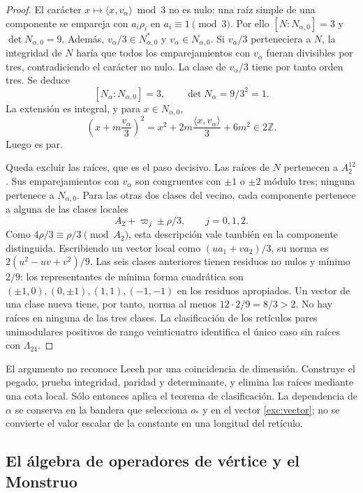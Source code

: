 \begin{proof}
El carácter $x\mapsto\langle x,v_\alpha\rangle\bmod3$ no es nulo:
una raíz simple de una componente se empareja con $a_i\rho_i$ en
$a_i\equiv1\pmod3$. Por ello $[N:N_{\alpha,0}]=3$ y
$\det N_{\alpha,0}=9$. Además,
$v_\alpha/3\in N_{\alpha,0}^*$ y $v_\alpha\in N_{\alpha,0}$.
Si $v_\alpha/3$ perteneciera a $N$, la integridad de $N$ haría que
todos los emparejamientos con $v_\alpha$ fueran divisibles por tres,
contradiciendo el carácter no nulo. La clase de $v_\alpha/3$ tiene
por tanto orden tres. Se deduce
\[
 [N_\alpha:N_{\alpha,0}]=3,
 \qquad \det N_\alpha=9/3^2=1.
\]
La extensión es integral, y para $x\in N_{\alpha,0}$,
\[
 \left(x+m\frac{v_\alpha}{3}\right)^2
   =x^2+2m\frac{\langle x,v_\alpha\rangle}{3}+6m^2
   \in2\mathbb Z.
\]
Luego es par.

Queda excluir las raíces, que es el paso decisivo. Las raíces de $N$
pertenecen a $A_2^{12}$. Sus emparejamientos con $v_\alpha$ son
congruentes con $\pm1$ o $\pm2$ módulo tres; ninguna pertenece a
$N_{\alpha,0}$. Para las otras dos clases del vecino, cada componente
pertenece a alguna de las clases locales
\[
 A_2+\varpi_j\pm\rho/3,\qquad j=0,1,2.
\]
Como $4\rho/3\equiv\rho/3\pmod{A_2}$, esta descripción vale
también en la componente distinguida. Escribiendo un vector local
como $(u a_1+v a_2)/3$, su norma es
$2(u^2-uv+v^2)/9$. Las seis clases anteriores tienen residuos no
nulos y mínimo $2/9$: los representantes de mínima forma cuadrática
son $(\pm1,0),(0,\pm1),(1,1),(-1,-1)$ en los residuos apropiados.
Un vector de una clase nueva tiene, por tanto, norma al menos
$12\cdot2/9=8/3>2$. No hay raíces en ninguna de las tres clases.
La clasificación de los retículos pares unimodulares positivos de
rango veinticuatro identifica el único caso sin raíces con
$\Lambda_{24}$.
\end{proof}

El argumento no reconoce Leech por una coincidencia de dimensión.
Construye el pegado, prueba integridad, paridad y determinante, y
elimina las raíces mediante una cota local. Sólo entonces aplica el
teorema de clasificación. La dependencia de $\alpha$ se conserva en
la bandera que selecciona $o_*$ y en el vector \eqref{exc:vector};
no se convierte el valor escalar de la constante en una longitud del
retículo.

\subsection{El álgebra de operadores de vértice y el Monstruo}
\label{exc:voa}


